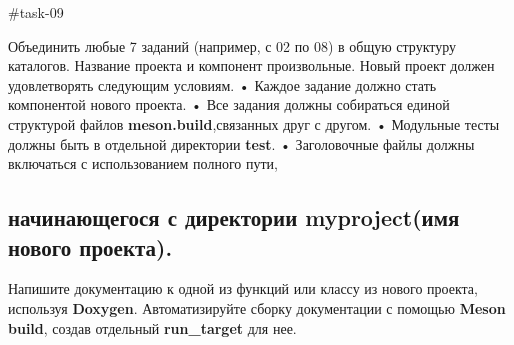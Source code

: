 \#task-\/09


\begin{DoxyEnumerate}
\item Объединить любые 7 заданий (например, с 02 по 08) в общую структуру каталогов. Название проекта и компонент произвольные. Новый проект должен удовлетворять следующим условиям. • Каждое задание должно стать компонентой нового проекта. • Все задания должны собираться единой структурой файлов {\bfseries meson.\+build},связанных друг с другом. • Модульные тесты должны быть в отдельной директории {\bfseries test}. • Заголовочные файлы должны включаться с использованием полного пути, \subsection*{начинающегося с директории myproject(имя нового проекта). }
\end{DoxyEnumerate}


\begin{DoxyEnumerate}
\item Напишите документацию к одной из функций или классу из нового проекта, используя {\bfseries Doxygen}. Автоматизируйте сборку документации с помощью {\bfseries Meson build}, создав отдельный {\bfseries run\+\_\+target} для нее. 
\end{DoxyEnumerate}